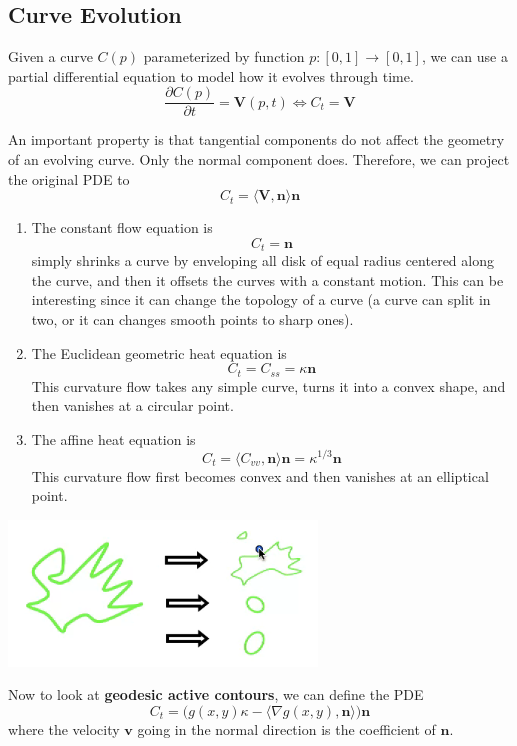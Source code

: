 \documentclass{article}
\begin{document}
  \subsection{Curve Evolution}

    Given a curve $C(p)$ parameterized by function $p: [0, 1] \rightarrow [0, 1]$, we can use a partial differential equation to model how it evolves through time. 
    \[\frac{\partial C(p)}{\partial t} = \mathbf{V} (p, t) \iff C_t = \mathbf{V}\]

    An important property is that tangential components do not affect the geometry of an evolving curve. Only the normal component does. Therefore, we can project the original PDE to 
    \[C_t = \langle \mathbf{V}, \mathbf{n} \rangle \mathbf{n}\]
    \begin{enumerate}
        \item The constant flow equation is 
        \[C_t = \mathbf{n}\]
        simply shrinks a curve by enveloping all disk of equal radius centered along the curve, and then it offsets the curves with a constant motion. This can be interesting since it can change the topology of a curve (a curve can split in two, or it can changes smooth points to sharp ones). 

        \item The Euclidean geometric heat equation is 
        \[C_t = C_{ss} = \kappa \mathbf{n}\]
        This curvature flow takes any simple curve, turns it into a convex shape, and then vanishes at a circular point.  

        \item The affine heat equation is 
        \[C_t = \langle C_{vv} , \mathbf{n} \rangle \mathbf{n} = \kappa^{1/3} \mathbf{n}\]
        This curvature flow first becomes convex and then vanishes at an elliptical point. 
    \end{enumerate}
    \begin{center}
        \includegraphics[scale=0.3]{img/3_heat_flows.png}
    \end{center}

    Now to look at \textbf{geodesic active contours}, we can define the PDE 
    \[C_t = \big( g(x, y) \kappa - \langle \nabla g(x, y), \mathbf{n}\rangle \big) \mathbf{n}\]
    where the velocity $\mathbf{v}$ going in the normal direction is the coefficient of $\mathbf{n}$. 
\end{document}
